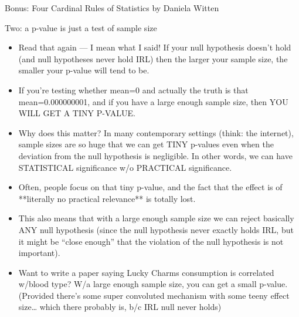 \documentclass[handout]{beamer}
\begin{document}
\begin{frame}{Bonus: Four Cardinal Rules of Statistics by Daniela Witten}
\scriptsize{


\begin{block}{Two:  a p-value is just a test of sample size}
\begin{itemize}
 \item  Read that again — I mean what I said!  If your null hypothesis doesn't hold (and null hypotheses never hold IRL) then the larger your sample size, the smaller your p-value will tend to be.
 \item If you’re testing whether mean=0 and actually the truth is that mean=0.000000001, and if you have a large enough sample size, then YOU WILL GET A TINY P-VALUE.
 \item Why does this matter? In many contemporary settings (think: the internet), sample sizes are so huge that we can get TINY p-values even when the deviation from the null hypothesis is negligible. In other words, we can have STATISTICAL significance w/o PRACTICAL significance.
 \item Often, people focus on that tiny p-value, and the fact that the effect is of **literally no practical relevance** is totally lost.
 \item This also means that with a large enough sample size we can reject basically ANY null hypothesis (since the null hypothesis never exactly holds IRL, but it might be “close enough” that the violation of the null hypothesis is not important). 
 \item Want to write a paper saying Lucky Charms consumption is correlated w/blood type? W/a large enough sample size, you can get a small p-value.  (Provided there’s some super convoluted mechanism with some teeny effect size… which there probably is, b/c IRL null never holds)
\end{itemize}

 
\end{block}


} 
\end{frame}
\end{document}

